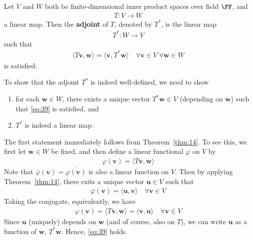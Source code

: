 \documentclass[thmcnt=section, color=blue, 12pt]{my-elegantbook}
\begin{document}
\begin{definition} \label{def:4}
	Let $V$ and $W$ both be finite-dimensional inner product spaces
	over field $\FF$,
	and 
	\begin{align*}
		T: V \to W
	\end{align*}
	a linear map. Then the \textbf{adjoint}
	of $T$, denoted by $T^\ast$, 
	is the linear map 
	\begin{align*}
		T^\ast: W \to V
	\end{align*}
	such that 
	\begin{align}
		\langle T \mathbf{v}, \mathbf{w} \rangle
		= \langle \mathbf{v}, T^\ast \mathbf{w} \rangle
		\quad \forall \mathbf{v} \in V \; \forall \mathbf{w} \in W
		\label{eq:39}
	\end{align}
	is satisfied. 
\end{definition}

To show that the adjoint $T^\ast$ is indeed well-defined, we need to show
\begin{enumerate}
	\item for each $\mathbf{w} \in W$,
		there exists a unique vector $T^\ast \mathbf{w} \in V$
		(depending on $\mathbf{w}$)
		such that \eqref{eq:39} is satisfied, and
	\item $T^\ast$ is indeed a linear map.
\end{enumerate}

The first statement immediately follows from Theorem~\ref{thm:14}.
To see this, we first let $\mathbf{w} \in W$ be fixed, 
and then define a linear functional $\varphi$ on $V$ by
\begin{align*}
	\varphi(\mathbf{v}) = \langle T \mathbf{v}, \mathbf{w} \rangle
\end{align*}
Note that $\bar{\varphi}(\mathbf{v}) = \overline{\varphi(\mathbf{v})}$
is also a linear function on $V$.
Then by applying Theorem~\ref{thm:14}, 
there exits a unique vector $\mathbf{u} \in V$ such that 
\begin{align*}
	\bar{\varphi}(\mathbf{v}) = \langle \mathbf{u}, \mathbf{v} \rangle
	\quad \forall \mathbf{v} \in V
\end{align*}
Taking the conjugate, equivalently, we have
\begin{align*}
	\varphi(\mathbf{v}) 
	= \langle T \mathbf{v}, \mathbf{w} \rangle
	= \langle \mathbf{v}, \mathbf{u} \rangle
	\quad \forall \mathbf{v} \in V
\end{align*}
Since $\mathbf{u}$ (uniquely) depends on $\mathbf{w}$ 
(and of course, also on $T$), 
we can write $\mathbf{u}$ as a function of $\mathbf{w}$, $T^\ast \mathbf{w}$.
Hence, \eqref{eq:39} holds.
\end{document}
